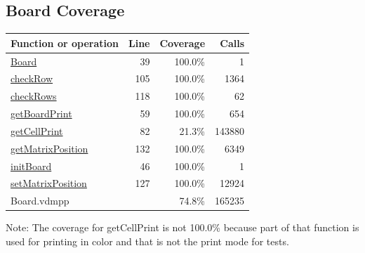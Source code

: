 \documentclass[a4paper]{article}
\begin{document}
\subsection{Board Coverage}
\begin{longtable}{|l|r|r|r|}
\hline
Function or operation & Line & Coverage & Calls \\
\hline
\hline
\hyperref[Board:39]{Board} & 39&100.0\% & 1 \\
\hline
\hyperref[checkRow:105]{checkRow} & 105&100.0\% & 1364 \\
\hline
\hyperref[checkRows:118]{checkRows} & 118&100.0\% & 62 \\
\hline
\hyperref[getBoardPrint:59]{getBoardPrint} & 59&100.0\% & 654 \\
\hline
\hyperref[getCellPrint:82]{getCellPrint} & 82&21.3\% & 143880 \\
\hline
\hyperref[getMatrixPosition:132]{getMatrixPosition} & 132&100.0\% & 6349 \\
\hline
\hyperref[initBoard:46]{initBoard} & 46&100.0\% & 1 \\
\hline
\hyperref[setMatrixPosition:127]{setMatrixPosition} & 127&100.0\% & 12924 \\
\hline
\hline
Board.vdmpp & & 74.8\% & 165235 \\
\hline
\end{longtable}

Note: The coverage for getCellPrint is not 100.0\% because part of that function is used for printing in color and that is not the print mode for tests.
\end{document}
